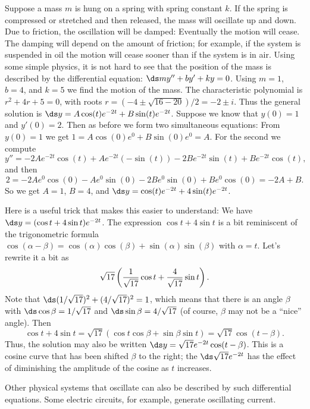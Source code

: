 \begin{solution}
 Suppose a mass $m$ is hung on a spring with spring
constant $k$. If the spring is compressed or stretched and then
released, the mass will oscillate up and down. Due to friction,
the oscillation will be damped: Eventually the motion will cease. The
damping will depend on the amount of friction; for example, if the
system is suspended in oil the motion will cease sooner than if the
system is in air. Using some simple physics, it is not hard to see
that the position of the mass is described by the differential
equation:
$\ds my''+by'+ky=0$. Using $m=1$, $b=4$, and $k=5$ we find the
motion of the mass. The characteristic polynomial is 
$r^2+4r+5=0$, with roots $r=(-4\pm\sqrt{16-20})/2=-2\pm i$. Thus the
general solution is
$\ds y=A\cos(t)e^{-2t}+B\sin(t)e^{-2t}$.
Suppose we know that $y(0)=1$ and $y'(0)=2$. Then as before we
form two simultaneous equations: From $y(0)=1$ we get
$1=A\cos(0)e^0+B\sin(0)e^0=A$. For the second we compute
$$y''=-2Ae^{-2t}\cos(t)+Ae^{-2t}(-\sin(t))-2Be^{-2t}\sin(t)+
Be^{-2t}\cos(t),$$
and then
$$2=-2Ae^0\cos(0)-Ae^0\sin(0)-2Be^0\sin(0)+Be^0\cos(0)
=-2A+B.$$
So we get $A=1$, $B=4$, and $\ds y=\cos(t)e^{-2t}+4\sin(t)e^{-2t}$.

Here is a useful trick that makes this easier to understand: We have
$\ds y=(\cos t+4\sin t)e^{-2t}$. The expression $\cos t+4 \sin t$ is a
bit reminiscent of the trigonometric formula
$\cos(\alpha-\beta)=\cos(\alpha)\cos(\beta)+\sin(\alpha)\sin(\beta)$
with $\alpha=t$.
Let's rewrite it a bit as
$$\sqrt{17}\left({1\over\sqrt{17}}\cos t + {4\over\sqrt{17}}\sin t\right).$$
Note that $\ds (1/\sqrt{17})^2+(4/\sqrt{17})^2=1$, 
which means that there is an angle
$\beta$ with $\ds \cos\beta=1/\sqrt{17}$ and 
$\ds \sin\beta=4/\sqrt{17}$ (of course, $\beta$ may not be a ``nice'' angle). Then
$$\cos t+4\sin t = \sqrt{17}\left(\cos t\cos \beta+\sin\beta\sin t\right)
=\sqrt{17}\cos(t-\beta).$$
Thus, the solution may also be written
$\ds y=\sqrt{17}e^{-2t}\cos(t-\beta)$.
This is a cosine curve  that has been shifted $\beta$ to the
right; the $\ds \sqrt{17}e^{-2t}$ has the effect of diminishing the
amplitude of the cosine as $t$ increases.
\end{solution}

Other physical systems that oscillate can also be described by such
differential equations. Some electric circuits, for example, generate
oscillating current.

